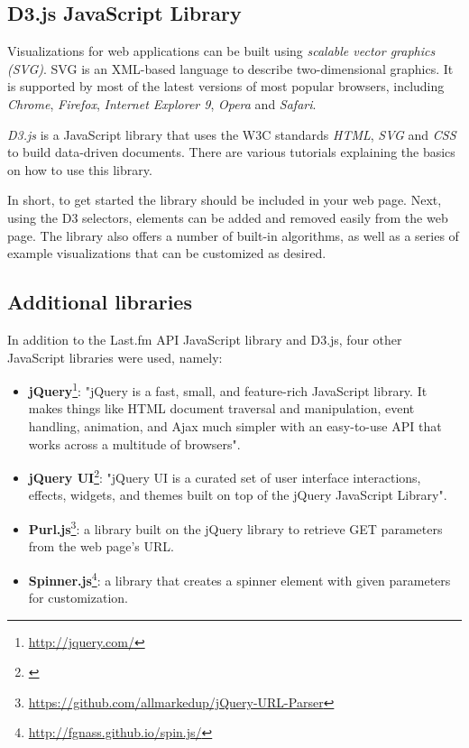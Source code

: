 \subsection{D3.js JavaScript Library}\label{chapter:implementation:section:technologies:subsection:d3js}

Visualizations for web applications can be built using \emph{scalable vector graphics} \emph{(SVG)}. SVG is an XML-based language to describe two-dimensional graphics\cite{w3c:2011:svg}. It is supported by most of the latest versions of most popular browsers, including \emph{Chrome}, \emph{Firefox}, \emph{Internet Explorer 9}, \emph{Opera} and \emph{Safari}\cite{microsoft:2012:svg, w3c:2010:svg}.

\emph{D3.js} is a JavaScript library that uses the W3C standards \emph{HTML}, \emph{SVG} and \emph{CSS} to build data-driven documents\cite{bostock:2012:d3js}. There are various tutorials explaining the basics on how to use this library.

In short, to get started the library should be included in your web page. Next, using the D3 selectors, elements can be added and removed easily from the web page. The library also offers a number of built-in algorithms, as well as a series of example visualizations that can be customized as desired.


\subsection{Additional libraries}\label{chapter:implementation:section:technologies:subsection:libs}

In addition to the Last.fm API JavaScript library and D3.js, four other JavaScript libraries were used, namely:

\begin{itemize}
	\item \textbf{jQuery}\footnote{\url{http://jquery.com/}}: "jQuery is a fast, small, and feature-rich JavaScript library. It makes things like HTML document traversal and manipulation, event handling, animation, and Ajax much simpler with an easy-to-use API that works across a multitude of browsers"\cite{jquery:2013}.
	\item \textbf{jQuery UI}\footnote{\url{}}: "jQuery UI is a curated set of user interface interactions, effects, widgets, and themes built on top of the jQuery JavaScript Library"\cite{jqueryui:2013}.
	\item \textbf{Purl.js}\footnote{\url{https://github.com/allmarkedup/jQuery-URL-Parser}}: a library built on the jQuery library to retrieve GET parameters from the web page's URL.
	\item \textbf{Spinner.js}\footnote{\url{http://fgnass.github.io/spin.js/}}: a library that creates a spinner element with given parameters for customization.
\end{itemize}


